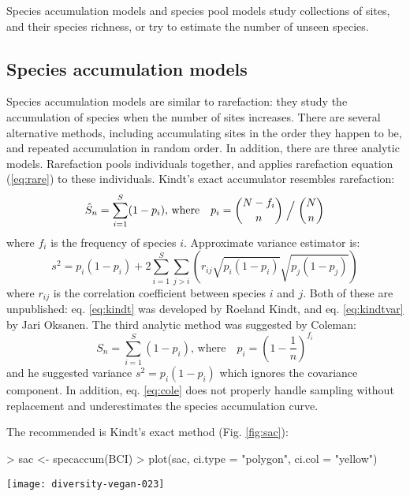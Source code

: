 \documentclass[a4paper,10pt]{amsart}
\begin{document}
Species accumulation models and species pool models study collections
of sites, and their species richness, or try to estimate the number of
unseen species.

\subsection{Species accumulation models}

Species accumulation models are similar to rarefaction: they study the
accumulation of species when the number of sites increases.  There are
several alternative methods, including accumulating sites in the order
they happen to be, and repeated accumulation in random order.  In
addition, there are three analytic models.  Rarefaction pools
individuals together, and applies rarefaction equation (\ref{eq:rare})
to these individuals.  Kindt's exact accumulator resembles rarefaction:
\begin{equation}
\label{eq:kindt}
\hat S_n = \sum_{i=1}^S (1 - p_i), \, \text{where} \quad p_i = {N- f_i
\choose n} \Bigm / {N \choose n}
\end{equation}
where $f_i$ is the frequency of species $i$.  Approximate variance
estimator is:
\begin{equation}
\label{eq:kindtvar}
s^2 = p_i (1 - p_i) + 2 \sum_{i=1}^S \sum_{j>i} \left( r_{ij}
  \sqrt{p_i(1-p_i)} \sqrt{p_j (1-p_j)}\right)
\end{equation}
where $r_{ij}$ is the correlation coefficient between species $i$ and
$j$.  Both of these are unpublished: eq. \ref{eq:kindt} was developed
by Roeland Kindt, and eq. \ref{eq:kindtvar} by Jari Oksanen. The third
analytic method was suggested by Coleman:
\begin{equation}
\label{eq:cole}
S_n = \sum_{i=1}^S (1 - p_i), \, \text{where} \quad p_i = \left(1 - \frac{1}{n}\right)^{f_i}
\end{equation}
and he suggested variance $s^2 = p_i (1-p_i)$ which ignores the
covariance component.  In addition, eq. \ref{eq:cole} does not
properly handle sampling without replacement and underestimates the
species accumulation curve.

The recommended is Kindt's exact method (Fig. \ref{fig:sac}):
\begin{Schunk}
\begin{Sinput}
> sac <- specaccum(BCI)
> plot(sac, ci.type = "polygon", ci.col = "yellow")
\end{Sinput}
\end{Schunk}
\begin{SCfigure}
\texttt{[image: diversity-vegan-023]}
\caption{Species accumulation curve for the BCI data; exact method.}
\label{fig:sac}
\end{SCfigure}
\end{document}
